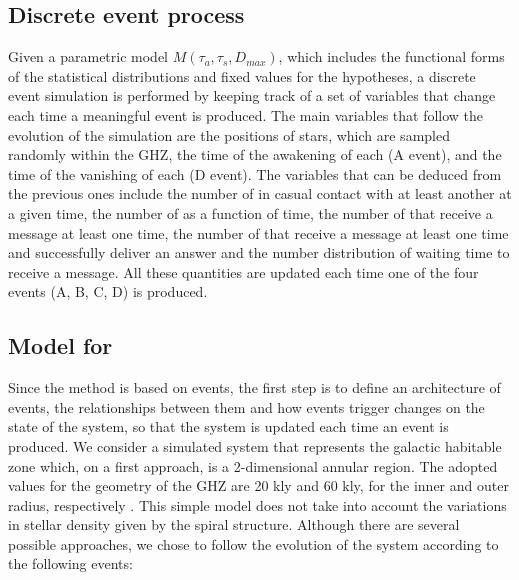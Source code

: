 



\subsection{Discrete event process}

Given a parametric model $M(\tau_a, \tau_s, D_{max})$, which includes
the functional forms of the statistical distributions and fixed values
for the hypotheses, a discrete event simulation is performed by
keeping track of a set of variables that change each time a meaningful
event is produced.
%
The main variables that follow the evolution of the simulation are the
positions of stars, which are sampled randomly within the GHZ, the
time of the awakening of each \ceti{} (A event), and the time of the
vanishing of each \ceti{} (D event).
%
The variables that can be deduced from the previous ones include the
number of \cetis{} in casual contact with at least another \ceti{} at a given
time, the number of \cetis{} as a function of time, the number of
\cetis{}
that receive a message at least one time, the number of \cetis{} that
receive a message at least one time and successfully deliver an answer
and the number distribution of waiting time to receive a message.
%
All these quantities are updated each time one of the four events (A,
B, C, D) is produced.
          

           

\subsection{Model for \cetis{}}

Since the method is based on events, the first step is to define an
architecture of events, the relationships between them and how events
trigger changes on the state of the system,
so that the system is updated each time an event is produced.
%
We consider a simulated system that represents the galactic habitable
zone which, on a first approach, is a 2-dimensional annular region.
%
The adopted values for the geometry of the GHZ are 20 kly and 60 kly, for the inner
and outer radius, respectively \citep{lineweaver_galactic_2004}.
%
This simple model does not take into account the variations in stellar
density given by the spiral structure.
%
Although there are several possible approaches, we chose to follow the
evolution of the system according to the following events:

